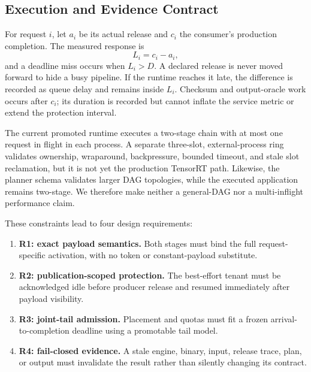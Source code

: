 \subsection{Execution and Evidence Contract}

For request $i$, let $a_i$ be its actual release and $c_i$ the consumer's
production completion.  The measured response is
\begin{equation}
  L_i = c_i-a_i ,
  \label{eq:production-wall}
\end{equation}
and a deadline miss occurs when $L_i>D$.  A declared release is never moved
forward to hide a busy pipeline.  If the runtime reaches it late, the
difference is recorded as queue delay and remains inside $L_i$.  Checksum and
output-oracle work occurs after $c_i$; its duration is recorded but cannot
inflate the service metric or extend the protection interval.

The current promoted runtime executes a two-stage chain with at most one
request in flight in each process.  A separate three-slot, external-process
ring validates ownership, wraparound, backpressure, bounded timeout, and stale
slot reclamation, but it is not yet the production TensorRT path.  Likewise,
the planner schema validates larger DAG topologies, while the executed
application remains two-stage.  We therefore make neither a general-DAG nor a
multi-inflight performance claim.

These constraints lead to four design requirements:
\begin{enumerate}[leftmargin=*,itemsep=1pt,topsep=2pt]
  \item \textbf{R1: exact payload semantics.}  Both stages must bind the full
  request-specific activation, with no token or constant-payload substitute.
  \item \textbf{R2: publication-scoped protection.}  The best-effort tenant
  must be acknowledged idle before producer release and resumed immediately
  after payload visibility.
  \item \textbf{R3: joint-tail admission.}  Placement and quotas must fit a
  frozen arrival-to-completion deadline using a promotable tail model.
  \item \textbf{R4: fail-closed evidence.}  A stale engine, binary, input,
  release trace, plan, or output must invalidate the result rather than
  silently changing its contract.
\end{enumerate}
